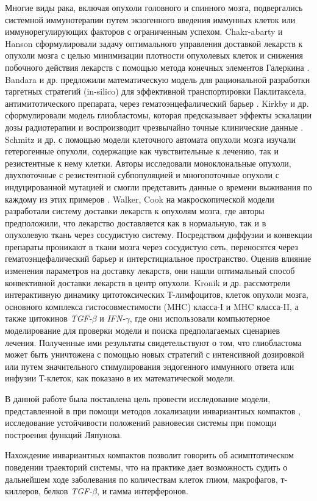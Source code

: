 \documentclass[14pt,a4paper]{extarticle}
\begin{document}
\begin{introduction}
	Многие виды рака, включая опухоли головного и спинного мозга, подвергались системной иммунотерапии путем экзогенного введения иммунных клеток или иммунорегулирующих факторов с ограниченным успехом. Chakr-abarty и Hanson сформулировали задачу оптимального управления доставкой лекарств к опухоли мозга с целью минимизации плотности опухолевых клеток и снижения побочного действия лекарств с помощью метода конечных элементов Галеркина \cite{Chakrabarty et.al.}. Bandara и др. предложили математическую модель для рациональной разработки таргетных стратегий (in-silico) для эффективной транспортировки Паклитаксела, антимитотического препарата, через гематоэнцефалический барьер \cite{Bandera}. Kirkby и др. сформулировали модель глиобластомы, которая предсказывает эффекты эскалации дозы радиотерапии и воспроизводит чрезвычайно точные клинические данные \cite{Kirkby et.al.}. Schmitz и др. с помощью модели клеточного автомата опухоли мозга изучали гетерогенные опухоли, содержащие как чувствительные к лечению, так и резистентные к нему клетки. Авторы исследовали моноклональные опухоли, двухпоточные с резистентной субпопуляцией и многопоточные опухоли с индуцированной мутацией и смогли представить данные о времени выживания по каждому из этих примеров \cite{Schmitz et.al.}. Walker, Cook \cite{Walker et.al.} на макроскопической модели разработали систему доставки лекарств к опухолям мозга, где авторы предположили, что лекарство доставляется как в нормальную, так и в опухолевую ткань через сосудистую систему. Посредством диффузии и конвекции препараты проникают в ткани мозга через сосудистую сеть, переносятся через гематоэнцефалический барьер и интерстициальное пространство. Оценив влияние изменения параметров на доставку лекарств, они нашли оптимальный способ конвективной доставки лекарств в центр опухоли. Kronik и др. \cite{Kronik et.al.} рассмотрели интерактивную динамику цитотоксических Т-лимфоцитов, клеток опухоли мозга, основного комплекса гистосовместимости (MHC) класса-I и MHC класса-II, а также цитокинов \textit{TGF-}$\beta$ и \textit{IFN-}$\gamma$, где они использовали компьютерное моделирование для проверки модели и поиска предполагаемых сценариев лечения. Полученные ими результаты свидетельствуют о том, что глиобластома может быть уничтожена с помощью новых стратегий с интенсивной дозировкой или путем значительного стимулирования эндогенного иммунного ответа или инфузии Т-клеток, как показано в их математической модели.
	
	В данной работе была поставлена цель провести исследование модели, представленной в \cite{model} при помощи методов локализации инвариантных компактов \cite{invar_comp, invar_comp_localization}, исследование устойчивости положений равновесия системы при помощи построения функций Ляпунова.
	
	Нахождение инвариантных компактов позволит говорить об асимптотическом поведении траекторий системы, что на практике дает возможность судить о дальнейшем ходе заболевания по количествам клеток глиом, макрофагов, т-киллеров, белков \textit{TGF-}$\beta$, и гамма интерферонов.
	
	\end{introduction}
	
\end{document}
